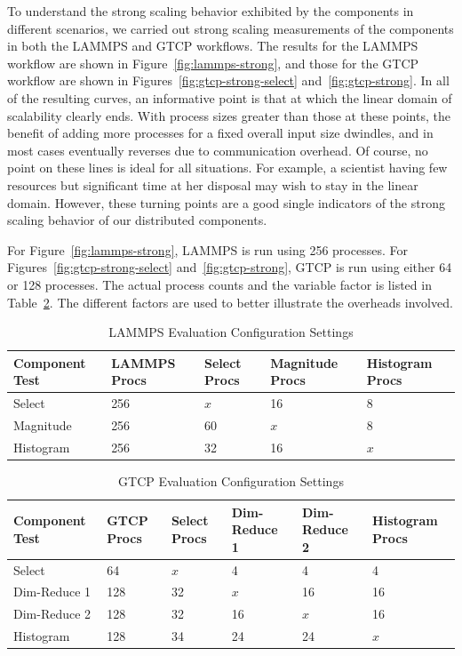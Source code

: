 \documentclass[conference]{IEEEtran}
\begin{document}
To understand the strong scaling behavior exhibited by the components in
different scenarios, we carried out strong scaling measurements of the
components in both the LAMMPS and GTCP workflows. The results for the LAMMPS
workflow are shown in Figure~\ref{fig:lammps-strong}, and those for the GTCP
workflow are shown in Figures~\ref{fig:gtcp-strong-select}
and~\ref{fig:gtcp-strong}. In all of the resulting curves, an informative point
is that at which the linear domain of scalability clearly ends. With process
sizes greater than those at these points, the benefit of adding more processes
for a fixed overall input size dwindles, and in most cases eventually reverses
due to communication overhead. Of course, no point on these lines is ideal for
all situations. For example, a scientist having few resources but significant
time at her disposal may wish to stay in the linear domain. However, these
turning points are a good single indicators of the strong scaling behavior of
our distributed components.

For Figure~\ref{fig:lammps-strong}, LAMMPS is run using 256 processes.  For
Figures~\ref{fig:gtcp-strong-select} and~\ref{fig:gtcp-strong}, GTCP is run
using either 64 or 128 processes. The actual process counts and the variable
factor is listed in Table~\ref{tab:eval}. The different factors are used to
better illustrate the overheads involved.

\begin{table}[tbp]
\centering
\caption{LAMMPS Evaluation Configuration Settings}
\label{tab:eval}
\begin{tabular}{|l|l|l|l|l|}
\hline
Component Test & LAMMPS Procs & Select Procs & Magnitude Procs & Histogram Procs \\
\hline
Select & 256 & $x$ & 16 & 8\\
\hline
Magnitude & 256 & 60 & $x$ & 8\\
\hline
Histogram & 256 & 32 & 16 & $x$\\
\hline
\end{tabular}
\end{table}


\begin{table}[tbp]
\centering
\caption{GTCP Evaluation Configuration Settings}
\label{tab:eval}
\begin{tabular}{|l|l|l|l|l|l|}
\hline
Component Test & GTCP Procs & Select Procs & Dim-Reduce 1 & Dim-Reduce 2 & Histogram Procs \\
\hline
Select & 64 & $x$ & 4 & 4 & 4\\
\hline
Dim-Reduce 1 & 128 & 32 & $x$ & 16 & 16\\
\hline
Dim-Reduce 2 & 128 & 32 & 16 & $x$ & 16\\
\hline
Histogram & 128 & 34 & 24 & 24 & $x$\\
\hline
\end{tabular}
\end{table}
\end{document}
